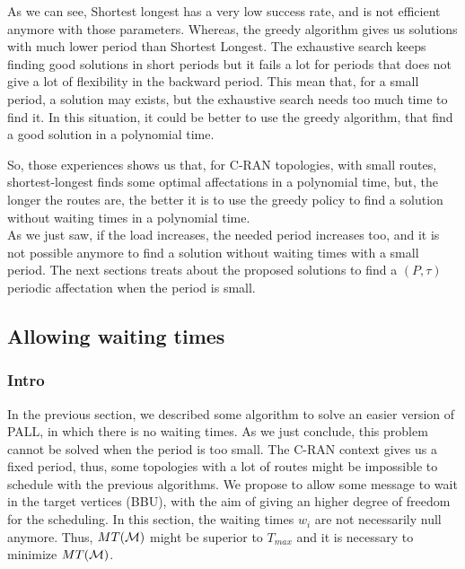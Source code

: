 \documentclass[a4paper,10pt]{article}
\begin{document}
      As we can see, Shortest longest has a very low success rate, and is not efficient anymore with those parameters.
      Whereas, the greedy algorithm gives us solutions with much lower period than Shortest Longest. The exhaustive search keeps finding good solutions in short periods but it fails a lot for periods that does not give a lot of flexibility in the backward period. This mean that, for a small period, a solution may exists, but the exhaustive search needs too much time to find it. In this situation, it could be better to use the greedy algorithm, that find a good solution in a polynomial time.

          
      So, those experiences shows us that, for C-RAN topologies, with small routes, shortest-longest finds some optimal affectations in a polynomial time, but, the longer the routes are, the better it is to use the greedy policy to find a solution without waiting times in a polynomial time.\\
    
      As we just saw, if the load increases, the needed period increases too, and it is not possible anymore to find a solution without waiting times with a small period. The next sections treats about the proposed solutions to find a $(P,\tau)$ periodic affectation when the period is small.
   \subsection{Allowing waiting times}
    
     \subsubsection{Intro}
     
	  In the previous section, we described some algorithm to solve an easier version of PALL, in which there is no waiting times. As we just conclude, this problem cannot be solved when the period is too small. The C-RAN context gives us a fixed period, thus, some topologies with a lot of routes might be impossible to schedule with the previous algorithms. We propose to allow some message to wait in the target vertices (BBU), with the aim of giving an higher degree of freedom for the scheduling. In this section, the waiting times $w_i$ are not necessarily null anymore. Thus, $MT({\cal M})$ might be superior to $T_{max}$ and it is necessary to minimize $MT({\cal M})$.
	   
	   
\end{document}
